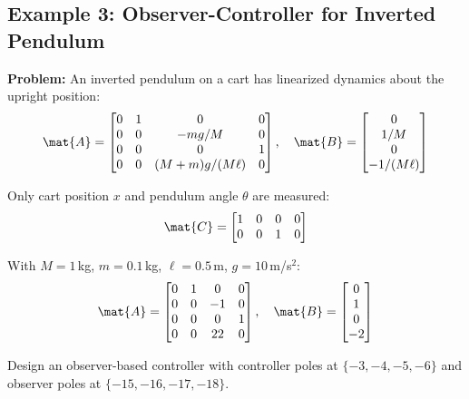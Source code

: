 \subsection{Example 3: Observer-Controller for Inverted Pendulum}

\textbf{Problem:} An inverted pendulum on a cart has linearized dynamics about the upright position:
\begin{equation}
\mat{A} = \begin{bmatrix} 0 & 1 & 0 & 0 \\ 0 & 0 & -mg/M & 0 \\ 0 & 0 & 0 & 1 \\ 0 & 0 & (M+m)g/(M\ell) & 0 \end{bmatrix}, \quad
\mat{B} = \begin{bmatrix} 0 \\ 1/M \\ 0 \\ -1/(M\ell) \end{bmatrix}
\end{equation}

Only cart position $x$ and pendulum angle $\theta$ are measured:
\begin{equation}
\mat{C} = \begin{bmatrix} 1 & 0 & 0 & 0 \\ 0 & 0 & 1 & 0 \end{bmatrix}
\end{equation}

With $M = 1\,$kg, $m = 0.1\,$kg, $\ell = 0.5\,$m, $g = 10\,$m/s$^2$:
\begin{equation}
\mat{A} = \begin{bmatrix} 0 & 1 & 0 & 0 \\ 0 & 0 & -1 & 0 \\ 0 & 0 & 0 & 1 \\ 0 & 0 & 22 & 0 \end{bmatrix}, \quad
\mat{B} = \begin{bmatrix} 0 \\ 1 \\ 0 \\ -2 \end{bmatrix}
\end{equation}

Design an observer-based controller with controller poles at $\{-3, -4, -5, -6\}$ and observer poles at $\{-15, -16, -17, -18\}$.


